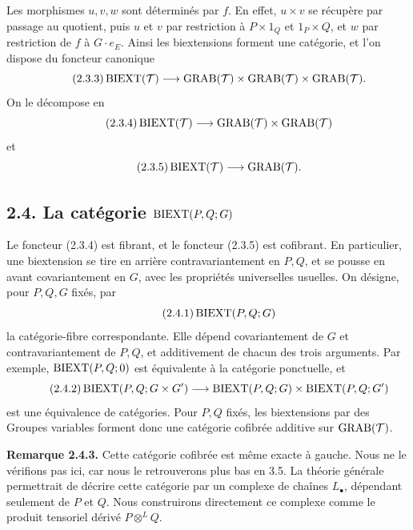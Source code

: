 \documentclass[11pt]{article}
\begin{document}
Les morphismes \(u,v,w\) sont déterminés par \(f\).  En effet, \(u\times v\) se récupère par passage au quotient, puis \(u\) et \(v\) par restriction à \(P\times1_Q\) et \(1_P\times Q\), et \(w\) par restriction de \(f\) à \(G\cdot e_E\).  Ainsi les biextensions forment une catégorie, et l'on dispose du foncteur canonique
\begin{equation}\qquad\text{(2.3.3)}
  \operatorname{BIEXT}(\mathcal T)\longrightarrow\operatorname{GRAB}(\mathcal T)\times\operatorname{GRAB}(\mathcal T)\times\operatorname{GRAB}(\mathcal T).
\end{equation}
On le décompose en
\begin{equation}\qquad\text{(2.3.4)}
  \operatorname{BIEXT}(\mathcal T)\longrightarrow\operatorname{GRAB}(\mathcal T)\times\operatorname{GRAB}(\mathcal T)
\end{equation}
et
\begin{equation}\qquad\text{(2.3.5)}
  \operatorname{BIEXT}(\mathcal T)\longrightarrow\operatorname{GRAB}(\mathcal T).
\end{equation}

\subsection*{2.4. La catégorie \(\operatorname{BIEXT}(P,Q;G)\)}
Le foncteur (2.3.4) est fibrant, et le foncteur (2.3.5) est cofibrant.  En particulier, une biextension se tire en arrière contravariantement en \(P,Q\), et se pousse en avant covariantement en \(G\), avec les propriétés universelles usuelles.  On désigne, pour \(P,Q,G\) fixés, par
\begin{equation}\qquad\text{(2.4.1)}
  \operatorname{BIEXT}(P,Q;G)
\end{equation}
la catégorie-fibre correspondante.  Elle dépend covariantement de \(G\) et contravariantement de \(P,Q\), et additivement de chacun des trois arguments.  Par exemple, \(\operatorname{BIEXT}(P,Q;0)\) est équivalente à la catégorie ponctuelle, et
\begin{equation}\qquad\text{(2.4.2)}
  \operatorname{BIEXT}(P,Q;G\times G')\longrightarrow
  \operatorname{BIEXT}(P,Q;G)\times\operatorname{BIEXT}(P,Q;G')
\end{equation}
est une équivalence de catégories.  Pour \(P,Q\) fixés, les biextensions par des Groupes variables forment donc une catégorie cofibrée additive sur \(\operatorname{GRAB}(\mathcal T)\).

\textbf{Remarque 2.4.3.}  Cette catégorie cofibrée est même exacte à gauche.  Nous ne le vérifions pas ici, car nous le retrouverons plus bas en 3.5.  La théorie générale permettrait de décrire cette catégorie par un complexe de chaînes \(L_\bullet\), dépendant seulement de \(P\) et \(Q\).  Nous construirons directement ce complexe comme le produit tensoriel dérivé \(P\otimes^L Q\).
\end{document}
